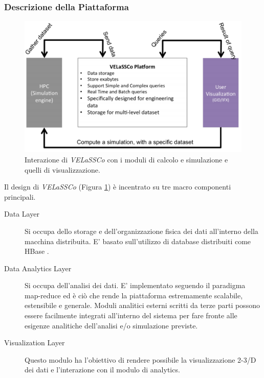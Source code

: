 \documentclass[a4paper,11pt]{paper}
\begin{document}
\subsubsection{Descrizione della Piattaforma}
\begin{figure}[h!]
 \centering
   \includegraphics[width=\textwidth]{vel}
 \caption{Interazione di \textit{VELaSSCo} con i moduli di calcolo e simulazione e quelli di visualizzazione.}
       \label{fig:vel}
 \end{figure}
Il design di \textit{VELaSSCo} (Figura \ref{fig:vel}) è incentrato su tre macro componenti principali.
\begin{description}
\item [Data Layer] Si occupa dello storage e dell'organizzazione fisica dei dati all'interno della macchina distribuita. E' basato sull'utilizzo di database distribuiti come HBase .
\item [Data Analytics Layer] Si occupa dell'analisi dei dati. E' implementato seguendo il paradigma map-reduce  ed è ciò che rende la piattaforma estremamente scalabile, estensibile e generale. Moduli analitici esterni scritti da terze parti possono essere facilmente integrati all'interno del sistema per fare fronte alle esigenze analitiche dell'analisi e/o simulazione previste.
\item [Visualization Layer] 
Questo modulo ha l'obiettivo di rendere possibile la visualizzazione 2-3/D dei dati e l'interazione con il modulo di analytics.
\end{description}
\end{document}
